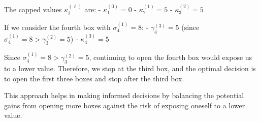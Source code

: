 The capped values \(\kappa_i^{(\ell)}\) are:
- \(\kappa_1^{(0)} = 0\)
- \(\kappa_2^{(1)} = 5\)
- \(\kappa_3^{(2)} = 5\)

If we consider the fourth box with \(\sigma_4^{(1)} = 8\):
- \(\gamma_4^{(3)} = 5\) (since \(\sigma_4^{(1)} = 8 > \gamma_3^{(2)} = 5\))
- \(\kappa_4^{(3)} = 5\)

Since \(\sigma_4^{(1)} = 8 > \gamma_3^{(2)} = 5\), continuing to open the fourth box would expose us to a lower value. Therefore, we stop at the third box, and the optimal decision is to open the first three boxes and stop after the third box.

This approach helps in making informed decisions by balancing the potential gains from opening more boxes against the risk of exposing oneself to a lower value.
